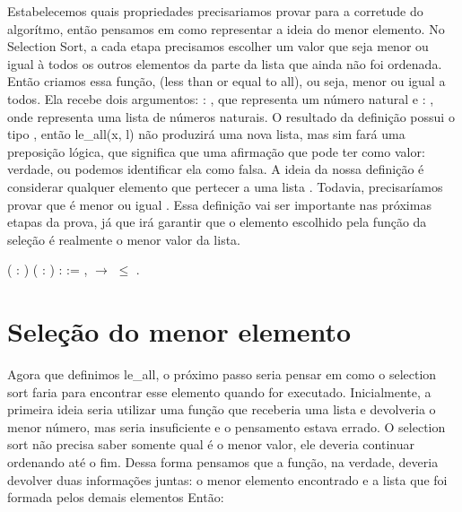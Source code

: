       Estabelecemos quais propriedades precisariamos provar para a corretude do algorítmo, então pensamos em como representar a ideia do menor elemento.
    No Selection Sort, a cada etapa precisamos escolher um valor que seja menor ou igual à todos os outros elementos da parte da lista que ainda não foi ordenada. 
    Então criamos essa função,  (less than or equal to all), ou seja,
    menor ou igual a todos. Ela recebe dois argumentos:  : , que  representa um número natural e :  , onde  representa uma lista de números naturais.
    O resultado da definição possui o tipo , então le\_all(x, l) não produzirá uma nova lista, mas sim fará uma preposição lógica, que significa
    que uma afirmação que pode ter como valor: verdade, ou podemos identificar ela como falsa. A ideia da nossa definição é considerar qualquer elemento  que pertecer a uma lista .
    Todavia, precisaríamos provar que  é menor ou igual .
    Essa definição vai ser importante nas próximas etapas da prova, já que irá garantir que o elemento escolhido pela função da seleção é realmente o menor valor da lista.
  
\begin{coqdoccode}
\coqdocemptyline
\coqdocnoindent
{}  ( : ) ( :  ) :  :=\coqdoceol
\coqdocindent{1.00em}
\coqdockw{\ensuremath{\forall}} ,    \ensuremath{\rightarrow}  \ensuremath{\le} .\coqdoceol
\coqdocemptyline
\end{coqdoccode}
\section{Seleção do menor elemento}




      Agora que definimos le\_all, o próximo passo seria pensar em como o selection sort faria para encontrar esse elemento quando for executado.
    Inicialmente, a primeira ideia seria utilizar uma função que receberia uma lista e devolveria o menor número, mas seria insuficiente e o pensamento estava errado.
    O selection sort não precisa saber somente qual é o menor valor, ele deveria continuar ordenando até o fim.
    Dessa forma pensamos que a função, na verdade, deveria devolver duas informações juntas: o menor elemento encontrado e a lista que foi formada pelos demais elementos    
    Então: 


